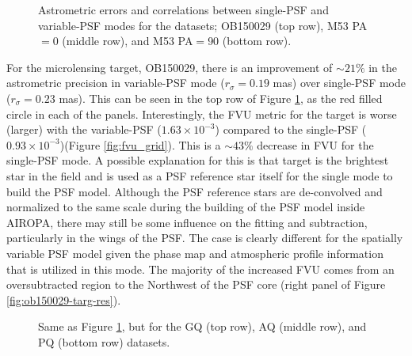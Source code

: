 \documentclass[]{spie}  %
\begin{document}
\begin{figure}[!h]
 \caption{\footnotesize Astrometric errors and correlations between single-PSF and variable-PSF modes for the datasets; OB150029 (top row), M53 PA$=$0 (middle row), and M53 PA$=$90 (bottom row).} \label{fig:ob-m53-astrom}
\end{figure}

\indent For the microlensing target, OB150029, there is an improvement of ${\sim}21\%$ in the astrometric precision in variable-PSF mode ($r_{\sigma}=0.19$ mas) over single-PSF mode ($r_{\sigma}=0.23$ mas). This can be seen in the top row of Figure \ref{fig:ob-m53-astrom}, as the red filled circle in each of the panels. Interestingly, the FVU metric for the target is worse (larger) with the variable-PSF ($1.63\times10^{-3}$) compared to the single-PSF ($0.93\times10^{-3}$)(Figure \ref{fig:fvu_grid}). This is a ${\sim}43\%$ decrease in FVU for the single-PSF mode. A possible explanation for this is that target is the brightest star in the field and is used as a PSF reference star itself for the single mode to build the PSF model. Although the PSF reference stars are de-convolved and normalized to the same scale during the building of the PSF model inside AIROPA, there may still be some influence on the fitting and subtraction, particularly in the wings of the PSF. The case is clearly different for the spatially variable PSF model given the phase map and atmospheric profile information that is utilized in this mode. The majority of the increased FVU comes from an oversubtracted region to the Northwest of the PSF core (right panel of Figure \ref{fig:ob150029-targ-res}).

\begin{figure}[!h]
 \caption{\footnotesize Same as Figure \ref{fig:ob-m53-astrom}, but for the GQ (top row), AQ (middle row), and PQ (bottom row) datasets.} \label{fig:gc-astrom}
\end{figure}
\end{document}
